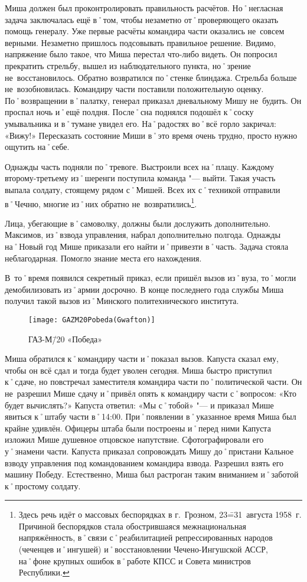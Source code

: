 Миша должен был проконтролировать правильность расчётов. Но˚негласная задача заключалась ещё в˚том, чтобы незаметно от˚проверяющего оказать помощь генералу. Уже первые расчёты командира части оказались не~совсем верными. Незаметно пришлось подсовывать правильное решение. Видимо, напряжение было такое, что Миша перестал что-либо видеть. Он попросил прекратить стрельбу, вышел из наблюдательного пункта, но˚зрение не~восстановилось. Обратно возвратился по˚стенке блиндажа. Стрельба больше не~возобновилась. Командиру части поставили положительную оценку. По˚возвращении в˚палатку, генерал приказал дневальному Мишу не~будить. Он проспал ночь и˚ещё полдня. После˚сна поднялся подошёл к˚соску умывальника и в˚тумане увидел его. На˚радостях во˚всё горло закричал: «Вижу!» Пересказать состояние Миши в˚это время очень трудно, просто нужно ощутить на˚себе.

Однажды часть подняли по˚тревоге. Выстроили всех на˚плацу. Каждому второму\--третьему из˚шеренги поступила команда "--- выйти. Такая участь выпала солдату, стоящему рядом с˚Мишей. Всех их с˚техникой отправили в˚Чечню, многие из˚них обратно не~возвратились\footnote
{Здесь речь идёт о массовых беспорядках в г.~Грозном, 23\==31~августа 1958~г. Причиной беспорядков стала обострившаяся межнациональная напряжённость, в˚связи с˚реабилитацией репрессированных народов (чеченцев и˚ингушей) и˚восстановлении Чечено-Ингушской АССР, на˚фоне крупных ошибок в˚работе КПСС и Совета министров Республики.}. 

Лица, убегающие в˚самоволку, должны были дослужить дополнительно. Максимов, из˚взвода управления, набрал дополнительно полгода. Однажды на˚Новый год Мише приказали его найти и˚привезти в˚часть. Задача стояла неблагодарная. Помогло знание места его нахождения. 

В~то˚время появился секретный приказ, если пришёл вызов из˚вуза, то˚могли демобилизовать из˚армии досрочно. В конце последнего года службы Миша получил такой вызов из˚Минского политехнического института. 

\begin{wrapfigure}{O}{.4\textwidth}
\centering
\texttt{[image: GAZM20Pobeda(Gwafton)]}
\caption[ГАЗ-М\=/20 «Победа»]{ГАЗ-М\=/20 «Победа»\footnotemark}
\label{fig:GAZM20Pobeda(Gwafton)}
\end{wrapfigure}

Миша обратился к˚командиру части и˚показал вызов. Капуста сказал ему, чтобы он всё сдал и тогда будет уволен сегодня. Миша быстро приступил к˚сдаче, но повстречал заместителя командира части по˚политической части. Он не~разрешил Мише сдачу и˚привёл опять к командиру части с˚вопросом: «Кто будет вычислять?» Капуста ответил: «Мы с˚тобой» "--- и приказал Мише явиться к˚штабу части в˚14:00. При˚появлении в˚указанное время Миша был крайне удивлён. Офицеры штаба были построены и˚перед ними Капуста изложил Мише душевное отцовское напутствие. Сфотографировали его у˚знамени части. Капуста приказал сопровождать Мишу до˚пристани Кальное взводу управления под командованием командира взвода. Разрешил взять его машину Победу. Естественно, Миша был растроган таким вниманием и˚заботой к˚простому солдату. 

